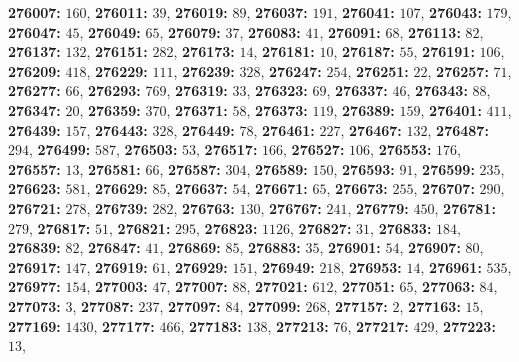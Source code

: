 \textsf{\bfseries 276007:} $160$, \textsf{\bfseries 276011:} $39$, \textsf{\bfseries 276019:} $89$, \textsf{\bfseries 276037:} $191$, \textsf{\bfseries 276041:} $107$, \textsf{\bfseries 276043:} $179$, \textsf{\bfseries 276047:} $45$, \textsf{\bfseries 276049:} $65$, \textsf{\bfseries 276079:} $37$, \textsf{\bfseries 276083:} $41$, \textsf{\bfseries 276091:} $68$, \textsf{\bfseries 276113:} $82$, \textsf{\bfseries 276137:} $132$, \textsf{\bfseries 276151:} $282$, \textsf{\bfseries 276173:} $14$, \textsf{\bfseries 276181:} $10$, \textsf{\bfseries 276187:} $55$, \textsf{\bfseries 276191:} $106$, \textsf{\bfseries 276209:} $418$, \textsf{\bfseries 276229:} $111$, \textsf{\bfseries 276239:} $328$, \textsf{\bfseries 276247:} $254$, \textsf{\bfseries 276251:} $22$, \textsf{\bfseries 276257:} $71$, \textsf{\bfseries 276277:} $66$, \textsf{\bfseries 276293:} $769$, \textsf{\bfseries 276319:} $33$, \textsf{\bfseries 276323:} $69$, \textsf{\bfseries 276337:} $46$, \textsf{\bfseries 276343:} $88$, \textsf{\bfseries 276347:} $20$, \textsf{\bfseries 276359:} $370$, \textsf{\bfseries 276371:} $58$, \textsf{\bfseries 276373:} $119$, \textsf{\bfseries 276389:} $159$, \textsf{\bfseries 276401:} $411$, \textsf{\bfseries 276439:} $157$, \textsf{\bfseries 276443:} $328$, \textsf{\bfseries 276449:} $78$, \textsf{\bfseries 276461:} $227$, \textsf{\bfseries 276467:} $132$, \textsf{\bfseries 276487:} $294$, \textsf{\bfseries 276499:} $587$, \textsf{\bfseries 276503:} $53$, \textsf{\bfseries 276517:} $166$, \textsf{\bfseries 276527:} $106$, \textsf{\bfseries 276553:} $176$, \textsf{\bfseries 276557:} $13$, \textsf{\bfseries 276581:} $66$, \textsf{\bfseries 276587:} $304$, \textsf{\bfseries 276589:} $150$, \textsf{\bfseries 276593:} $91$, \textsf{\bfseries 276599:} $235$, \textsf{\bfseries 276623:} $581$, \textsf{\bfseries 276629:} $85$, \textsf{\bfseries 276637:} $54$, \textsf{\bfseries 276671:} $65$, \textsf{\bfseries 276673:} $255$, \textsf{\bfseries 276707:} $290$, \textsf{\bfseries 276721:} $278$, \textsf{\bfseries 276739:} $282$, \textsf{\bfseries 276763:} $130$, \textsf{\bfseries 276767:} $241$, \textsf{\bfseries 276779:} $450$, \textsf{\bfseries 276781:} $279$, \textsf{\bfseries 276817:} $51$, \textsf{\bfseries 276821:} $295$, \textsf{\bfseries 276823:} $1126$, \textsf{\bfseries 276827:} $31$, \textsf{\bfseries 276833:} $184$, \textsf{\bfseries 276839:} $82$, \textsf{\bfseries 276847:} $41$, \textsf{\bfseries 276869:} $85$, \textsf{\bfseries 276883:} $35$, \textsf{\bfseries 276901:} $54$, \textsf{\bfseries 276907:} $80$, \textsf{\bfseries 276917:} $147$, \textsf{\bfseries 276919:} $61$, \textsf{\bfseries 276929:} $151$, \textsf{\bfseries 276949:} $218$, \textsf{\bfseries 276953:} $14$, \textsf{\bfseries 276961:} $535$, \textsf{\bfseries 276977:} $154$, \textsf{\bfseries 277003:} $47$, \textsf{\bfseries 277007:} $88$, \textsf{\bfseries 277021:} $612$, \textsf{\bfseries 277051:} $65$, \textsf{\bfseries 277063:} $84$, \textsf{\bfseries 277073:} $3$, \textsf{\bfseries 277087:} $237$, \textsf{\bfseries 277097:} $84$, \textsf{\bfseries 277099:} $268$, \textsf{\bfseries 277157:} $2$, \textsf{\bfseries 277163:} $15$, \textsf{\bfseries 277169:} $1430$, \textsf{\bfseries 277177:} $466$, \textsf{\bfseries 277183:} $138$, \textsf{\bfseries 277213:} $76$, \textsf{\bfseries 277217:} $429$, \textsf{\bfseries 277223:} $13$, 

